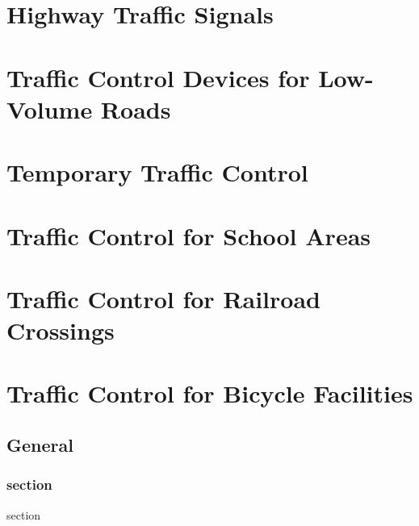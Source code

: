 \documentclass[9pt]{memoir}
\begin{document}


\part{Highway Traffic Signals}



\part{Traffic Control Devices for Low-Volume Roads}



\part{Temporary Traffic Control}



\part{Traffic Control for School Areas}



\part{Traffic Control for Railroad Crossings}



\part{Traffic Control for Bicycle Facilities}



\renewcommand{\thechapter}{\arabic{chapter}}


\chapter{General}

\section{section}

section
\end{document}

